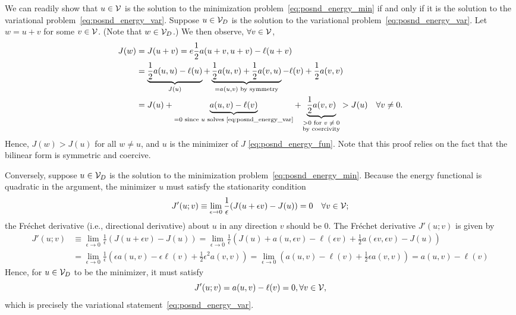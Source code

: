 We can readily show that $u \in \mathcal{V}$ is the solution to the minimization problem~\eqref{eq:posnd_energy_min} if and only if it is the solution to the variational problem~\eqref{eq:posnd_energy_var}. Suppose $u \in \mathcal{V}_D$ is the solution to the variational problem~\eqref{eq:posnd_energy_var}. Let $w = u + v$ for some $v \in \mathcal{V}$.  (Note that $w \in \mathcal{V}_D$.)  We then observe, $\forall v \in \mathcal{V}$,
\begin{align*}
  J(w)
  &=
  J(u+v)
  =
  e\frac{1}{2} a(u+v,u+v) - \ell(u+v)
  \\
  &=
  \underbrace{\frac{1}{2} a(u,u) - \ell(u)}_{J(u)} + \underbrace{ \frac{1}{2} a(u,v) + \frac{1}{2} a(v,u)}_{= a(u,v) \text{ by symmetry}} - \ell(v) + \frac{1}{2} a(v,v)
  \\
  &=
  J(u) + \underbrace{ a(u,v) - \ell(v) }_{= 0 \text{ since $u$ solves \eqref{eq:posnd_energy_var}}} + \underbrace{ \frac{1}{2} a(v,v) }_{\substack{> 0 \text{ for $v \neq 0$}\\\text{by coercivity}}} > J(u) \quad \forall v \neq 0.
\end{align*}
Hence, $J(w) > J(u)$ for all $w \neq u$, and $u$ is the minimizer of $J$ \eqref{eq:posnd_energy_fun}.  Note that this proof relies on the fact that the bilinear form is symmetric and coercive.

Conversely, suppose $u \in \mathcal{V}_D$ is the solution to the minimization problem~\eqref{eq:posnd_energy_min}. Because the energy functional is quadratic in the argument, the minimizer $u$ must satisfy the stationarity condition
\begin{equation*}
  J'(u;v) \equiv \lim_{\epsilon \to 0} \frac{1}{\epsilon}(J(u+\epsilon v) - J(u)) = 0 \quad \forall v \in \mathcal{V};
\end{equation*}
the Fr\'echet derivative (i.e., directional derivative) about $u$ in any direction $v$ should be 0. The Fr\'echet derivative $J'(u;v)$ is given by
\begin{align*}
  J'(u;v)
  &\equiv
  \lim_{\epsilon \to 0} \frac{1}{\epsilon}(J(u+\epsilon v) - J(u))
  = \lim_{\epsilon \to 0} \frac{1}{\epsilon}(J(u) + a(u,\epsilon v) - \ell(\epsilon v) + \frac{1}{2} a(\epsilon v, \epsilon v) - J(u))
  \\
  &= \lim_{\epsilon \to 0} \frac{1}{\epsilon} (\epsilon a(u,v) - \epsilon \ell(v) + \frac{1}{2} \epsilon^2 a(v,v))
  = \lim_{\epsilon \to 0} (a(u,v) - \ell(v) + \frac{1}{2} \epsilon a(v,v))
  = a(u,v) - \ell(v) 
\end{align*}
Hence, for $u \in \mathcal{V}_D$ to be the minimizer, it must satisfy
\begin{equation*}
  J'(u;v) = a(u,v) - \ell(v) = 0, \forall v \in \mathcal{V},
\end{equation*}
which is precisely the variational statement~\eqref{eq:posnd_energy_var}.

